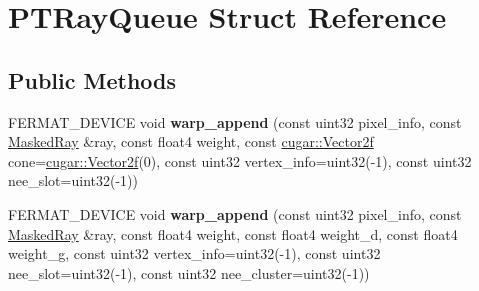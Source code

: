 \hypertarget{struct_p_t_ray_queue}{}\section{P\+T\+Ray\+Queue Struct Reference}
\label{struct_p_t_ray_queue}
\subsection*{Public Methods}
\begin{DoxyCompactItemize}
\item 
\mbox{\label{struct_p_t_ray_queue_a1ec2884588889c325a4674e461a1bdf7}} 
F\+E\+R\+M\+A\+T\+\_\+\+D\+E\+V\+I\+CE void {\bfseries warp\+\_\+append} (const uint32 pixel\+\_\+info, const \hyperlink{struct_masked_ray}{Masked\+Ray} \&ray, const float4 weight, const \hyperlink{structcugar_1_1_vector}{cugar\+::\+Vector2f} cone=\hyperlink{structcugar_1_1_vector}{cugar\+::\+Vector2f}(0), const uint32 vertex\+\_\+info=uint32(-\/1), const uint32 nee\+\_\+slot=uint32(-\/1))
\item 
\mbox{\label{struct_p_t_ray_queue_a628174eca7254d845b11c126b98d04a0}} 
F\+E\+R\+M\+A\+T\+\_\+\+D\+E\+V\+I\+CE void {\bfseries warp\+\_\+append} (const uint32 pixel\+\_\+info, const \hyperlink{struct_masked_ray}{Masked\+Ray} \&ray, const float4 weight, const float4 weight\+\_\+d, const float4 weight\+\_\+g, const uint32 vertex\+\_\+info=uint32(-\/1), const uint32 nee\+\_\+slot=uint32(-\/1), const uint32 nee\+\_\+cluster=uint32(-\/1))
\end{DoxyCompactItemize}
